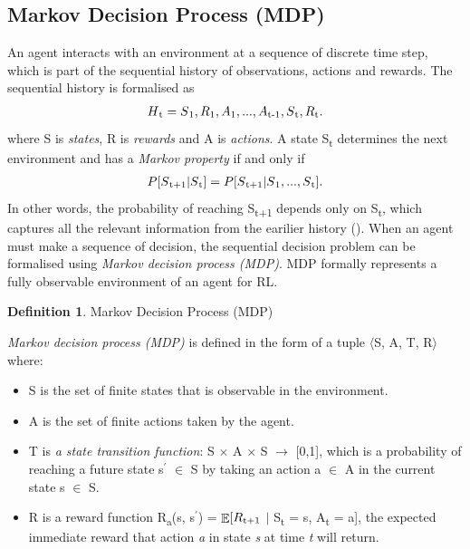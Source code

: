 \documentclass[12pt,twoside]{report}
\theoremstyle{plain}
\theoremstyle{definition}
\newtheorem{defn}[thm]{Definition} %
\DeclareMathOperator{\E}{\mathbb{E}}
\begin{document}
\subsection{Markov Decision Process (MDP)}
\label{mdp_subsection}
An agent interacts with an environment at a sequence of discrete time step, which is part of the sequential history of observations, actions and rewards. The sequential history is formalised as 
\begin{equation}
\begin{split}
H\textsubscript{t} = S\textsubscript{1}, R\textsubscript{1}, A\textsubscript{1}, ..., A\textsubscript{t-1}, S\textsubscript{t}, R\textsubscript{t}.  
\end{split}
\end{equation}
where S is \textit{states}, R is \textit{rewards} and A is \textit{actions}. A state S\textsubscript{t} determines the next environment and has a \textit{Markov property} if and only if 
\begin{equation}
\begin{split}
P[S\textsubscript{t+1} \vert S\textsubscript{t}] = P[S\textsubscript{t+1} \vert S\textsubscript{1}, ..., S\textsubscript{t}].
\end{split}
\end{equation}
In other words, the probability of reaching S\textsubscript{t+1} depends only on S\textsubscript{t}, which captures all the relevant information from the earilier history (\cite{Puterman1994}).
When an agent must make a sequence of decision, the sequential decision problem can be formalised using \textit{Markov decision process (MDP)}. MDP formally represents a fully observable environment of an agent for 
RL.
\begin{defn}{Markov Decision Process (MDP)}

\textit{Markov decision process (MDP)} is defined in the form of a tuple $\langle$S, A, T, R$\rangle$ where:
\begin{itemize}
\item S is the set of finite states that is observable in the environment.
\item A is the set of finite actions taken by the agent.
\item T is \textit{a state transition function}: S $\times$ A $\times$ S $\rightarrow$ [0,1], which is a probability of reaching a future state s$^\prime$ $\in$ S by taking an action a $\in$ A in the current state  s $\in$ S.
\item R is a reward function R\textsubscript{a}(s, s$^\prime$) = $\displaystyle \E[R\textsubscript{t+1} $ $\vert$ S\textsubscript{t} = s, A\textsubscript{t} = a], the expected immediate reward that action \textit{a} in state \textit{s} at time \textit{t} will return.
\end{itemize}
\end{defn}
\end{document}
